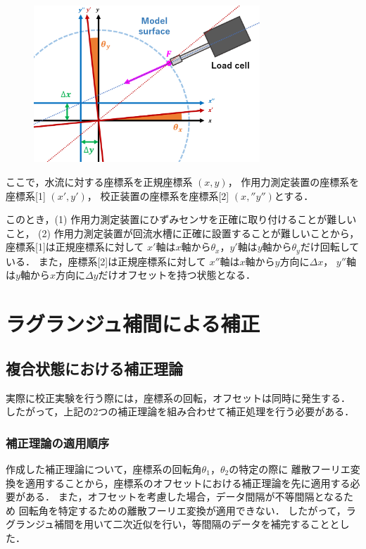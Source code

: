 \documentclass[twocolumn,a4j]{jsarticle}
\begin{document}
\begin{figure}[htbp]
    \footnotesize
    \begin{center}
        \includegraphics[width=85mm]{../../graduation_thesis/images/31-1.png}
        \caption{}
    \end{center}
\end{figure}

ここで，水流に対する座標系を正規座標系 $(x,y)$，
作用力測定装置の座標系を座標系[1] $(x',y')$，
校正装置の座標系を座標系[2] $(x,'' y'')$とする．

このとき，(1) 作用力測定装置にひずみセンサを正確に取り付けることが難しいこと，
(2) 作用力測定装置が回流水槽に正確に設置することが難しいことから，
座標系[1]は正規座標系に対して
$x'$軸は$x$軸から$\theta_x$，$y'$軸は$y$軸から$\theta_y$だけ回転している．
また，座標系[2]は正規座標系に対して
$x''$軸は$x$軸から$y$方向に$\Delta x$，
$y''$軸は$y$軸から$x$方向に$\Delta y$だけオフセットを持つ状態となる．

\section{ラグランジュ補間による補正}

\subsection{複合状態における補正理論}

実際に校正実験を行う際には，座標系の回転，オフセットは同時に発生する．
したがって，上記の2つの補正理論を組み合わせて補正処理を行う必要がある．\\

\subsubsection{補正理論の適用順序}

作成した補正理論について，座標系の回転角$\theta_1$，$\theta_2$の特定の際に
離散フーリエ変換を適用することから，座標系のオフセットにおける補正理論を先に適用する必要がある．
また，オフセットを考慮した場合，データ間隔が不等間隔となるため
回転角を特定するための離散フーリエ変換が適用できない．
したがって，ラグランジュ補間を用いて二次近似を行い，等間隔のデータを補完することとした．\\
\end{document}
